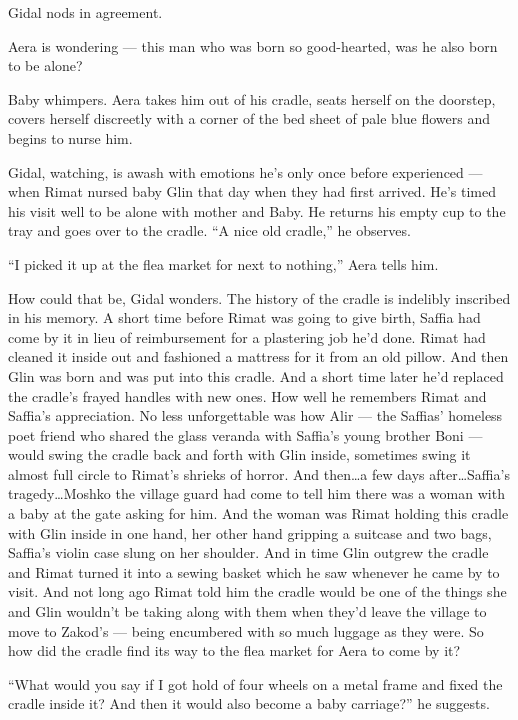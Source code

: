 \documentclass[twoside,11pt,openany]{book}
\begin{document}
Gidal nods in agreement.

Aera is wondering --- this man who was born so good-hearted, was he also born to be alone?

Baby whimpers. Aera takes him out of his cradle, seats herself on the doorstep, covers herself
discreetly with a corner of the bed sheet of pale blue flowers and begins to
nurse him.

Gidal, watching, is awash with emotions{ }he's only once before experienced --- when Rimat nursed baby
Glin that day when they had first arrived. He's timed his visit well to be alone with mother and Baby. He returns his
empty cup to the tray and goes over to the cradle. ``A nice old cradle,'' he
observes{.}

``I picked it up at the flea market for next to nothing,'' Aera tells
him{.}

How could that be, Gidal wonders. The history of the cradle is indelibly inscribed in his memory. A short time before
Rimat was going to give birth, Saffia had come by it in lieu of reimbursement for a plastering
job{ }he'd done. Rimat had cleaned it inside out and fashioned a mattress for
it from an old pillow. And then Glin was born and was put into this cradle. And a short time later he'd replaced
the cradle's frayed handles with new ones. How well he remembers Rimat and Saffia's appreciation. No less unforgettable
was how Alir --- the Saffias{'} homeless poet friend who shared the glass veranda with Saffia's young brother Boni ---
would swing the cradle back and forth with Glin inside, sometimes swing it almost full circle to Rimat's shrieks of
horror. And then{\ldots}a few days after{\ldots}Saffia's tragedy{\ldots}Moshko the village guard had come to tell him
there was a woman with a baby at the gate asking for him. And the woman was Rimat holding this cradle with Glin inside
in one hand, her other hand gripping a suitcase and two bags, Saffia's violin case slung on her shoulder. And in time
Glin outgrew the cradle and Rimat turned it into a sewing basket which he saw whenever he came by to visit. And not
long ago Rimat told him the cradle would be one of the things she and Glin wouldn't be taking along with them when
they'd leave the village to move to Zakod's --- being encumbered with so
much luggage as they were. So how did the cradle find its way to the flea market for Aera to come by it?

``What would you say if I got hold of four wheels on a metal frame and fixed the cradle inside it? And then
it would also become a baby carriage?''   he suggests.
\end{document}
